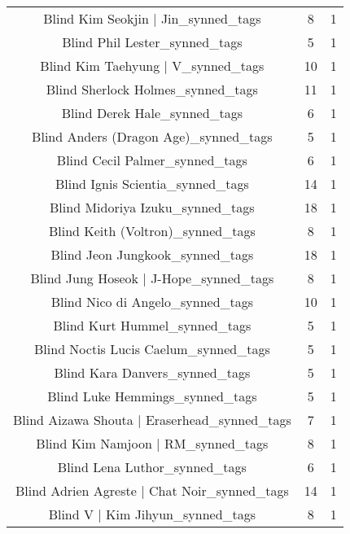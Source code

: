 \begin{table}[h!]
{\begin{tabular}{|c|c|c|}
               Blind Kim Seokjin | Jin\_synned\_tags &           8 &          1 \\
                     Blind Phil Lester\_synned\_tags &           5 &          1 \\
                Blind Kim Taehyung | V\_synned\_tags &          10 &          1 \\
                 Blind Sherlock Holmes\_synned\_tags &          11 &          1 \\
                      Blind Derek Hale\_synned\_tags &           6 &          1 \\
             Blind Anders (Dragon Age)\_synned\_tags &           5 &          1 \\
                    Blind Cecil Palmer\_synned\_tags &           6 &          1 \\
                  Blind Ignis Scientia\_synned\_tags &          14 &          1 \\
                  Blind Midoriya Izuku\_synned\_tags &          18 &          1 \\
                 Blind Keith (Voltron)\_synned\_tags &           8 &          1 \\
                   Blind Jeon Jungkook\_synned\_tags &          18 &          1 \\
            Blind Jung Hoseok | J-Hope\_synned\_tags &           8 &          1 \\
                  Blind Nico di Angelo\_synned\_tags &          10 &          1 \\
                     Blind Kurt Hummel\_synned\_tags &           5 &          1 \\
             Blind Noctis Lucis Caelum\_synned\_tags &           5 &          1 \\
                    Blind Kara Danvers\_synned\_tags &           5 &          1 \\
                   Blind Luke Hemmings\_synned\_tags &           5 &          1 \\
      Blind Aizawa Shouta | Eraserhead\_synned\_tags &           7 &          1 \\
                Blind Kim Namjoon | RM\_synned\_tags &           8 &          1 \\
                     Blind Lena Luthor\_synned\_tags &           6 &          1 \\
      Blind Adrien Agreste | Chat Noir\_synned\_tags &          14 &          1 \\
                  Blind V | Kim Jihyun\_synned\_tags &           8 &          1 \\

\end{tabular}}
\end{table}
